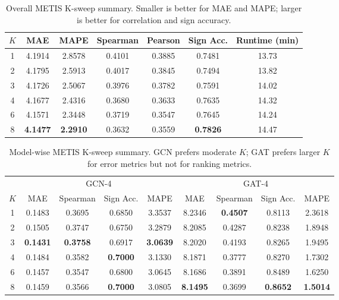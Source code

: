 
\begin{table}[t]
\centering
\setlength{\tabcolsep}{4pt}
\renewcommand{\arraystretch}{1.12}
\begin{tabular}{c|cc|cc|cc}
\toprule
$K$ & MAE & MAPE & Spearman & Pearson & Sign Acc. & Runtime (min) \\
\midrule
1 & 4.1914 & 2.8578 & 0.4101 & 0.3885 & 0.7481 & 13.73 \\
2 & 4.1795 & 2.5913 & 0.4017 & 0.3845 & 0.7494 & 13.82 \\
3 & 4.1726 & 2.5067 & 0.3976 & 0.3782 & 0.7591 & 14.02 \\
4 & 4.1677 & 2.4316 & 0.3680 & 0.3633 & 0.7635 & 14.32 \\
6 & 4.1571 & 2.3448 & 0.3719 & 0.3547 & 0.7645 & 14.24 \\
8 & \textbf{4.1477} & \textbf{2.2910} & 0.3632 & 0.3559 & \textbf{0.7826} & 14.47 \\
\bottomrule
\end{tabular}
\caption{Overall METIS K-sweep summary. Smaller is better for MAE and MAPE; larger is better for correlation and sign accuracy.}
\label{tab:metis_k_sweep_overall}
\end{table}

\begin{table}[t]
\centering
\setlength{\tabcolsep}{4pt}
\renewcommand{\arraystretch}{1.12}
\begin{tabular}{c|cc|cc||cc|cc}
\toprule
& \multicolumn{4}{c||}{GCN-4} & \multicolumn{4}{c}{GAT-4} \\
$K$ & MAE & Spearman & Sign Acc. & MAPE & MAE & Spearman & Sign Acc. & MAPE \\
\midrule
1 & 0.1483 & 0.3695 & 0.6850 & 3.3537 & 8.2346 & \textbf{0.4507} & 0.8113 & 2.3618 \\
2 & 0.1505 & 0.3747 & 0.6750 & 3.2879 & 8.2085 & 0.4287 & 0.8238 & 1.8948 \\
3 & \textbf{0.1431} & \textbf{0.3758} & 0.6917 & \textbf{3.0639} & 8.2020 & 0.4193 & 0.8265 & 1.9495 \\
4 & 0.1484 & 0.3582 & \textbf{0.7000} & 3.1330 & 8.1871 & 0.3777 & 0.8270 & 1.7302 \\
6 & 0.1457 & 0.3547 & 0.6800 & 3.0645 & 8.1686 & 0.3891 & 0.8489 & 1.6250 \\
8 & 0.1459 & 0.3566 & \textbf{0.7000} & 3.0805 & \textbf{8.1495} & 0.3699 & \textbf{0.8652} & \textbf{1.5014} \\
\bottomrule
\end{tabular}
\caption{Model-wise METIS K-sweep summary. GCN prefers moderate $K$; GAT prefers larger $K$ for error metrics but not for ranking metrics.}
\label{tab:metis_k_sweep_models}
\end{table}

